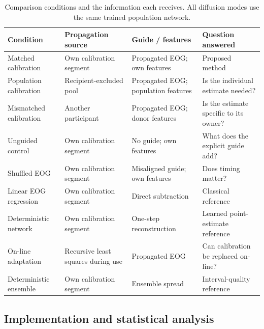 \begin{table}[t]
\caption{Comparison conditions and the information each receives. All diffusion modes use the same trained population network.}
\label{tab:variants}
\centering
\small
\begin{tabularx}{\textwidth}{@{}p{}Yp{.20\textwidth}p{.24\textwidth}@{}}
\toprule
Condition & Propagation source & Guide / features & Question answered \\
\midrule
Matched calibration & Own calibration segment & Propagated EOG; own features & Proposed method \\
Population calibration & Recipient-excluded pool & Propagated EOG; population features & Is the individual estimate needed? \\
Mismatched calibration & Another participant & Propagated EOG; donor features & Is the estimate specific to its owner? \\
Unguided control & Own calibration segment & No guide; own features & What does the explicit guide add? \\
Shuffled EOG & Own calibration segment & Misaligned guide; own features & Does timing matter? \\
Linear EOG regression & Own calibration segment & Direct subtraction & Classical reference \\
Deterministic network & Own calibration segment & One-step reconstruction & Learned point-estimate reference \\
On-line adaptation & Recursive least squares during use & Propagated EOG & Can calibration be replaced on-line? \\
Deterministic ensemble & Own calibration segment & Ensemble spread & Interval-quality reference \\
\bottomrule
\end{tabularx}
\end{table}

\subsection{Implementation and statistical analysis}
\label{sec:exp-implementation}

